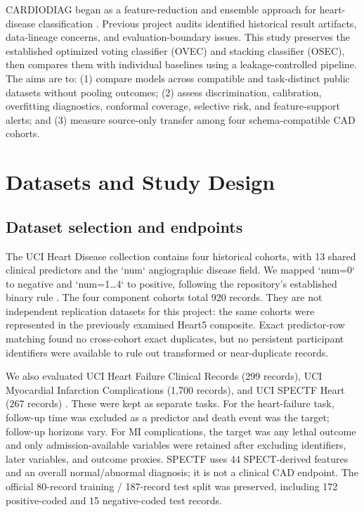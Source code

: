 \documentclass[conference]{IEEEtran}
\begin{document}
CARDIODIAG began as a feature-reduction and ensemble approach for heart-disease classification \cite{khan2026cardiodiag}. Previous project audits identified historical result artifacts, data-lineage concerns, and evaluation-boundary issues. This study preserves the established optimized voting classifier (OVEC) and stacking classifier (OSEC), then compares them with individual baselines using a leakage-controlled pipeline. The aims are to: (1) compare models across compatible and task-distinct public datasets without pooling outcomes; (2) assess discrimination, calibration, overfitting diagnostics, conformal coverage, selective risk, and feature-support alerts; and (3) measure source-only transfer among four schema-compatible CAD cohorts.

\section{Datasets and Study Design}
\subsection{Dataset selection and endpoints}
The UCI Heart Disease collection contains four historical cohorts, with 13 shared clinical predictors and the `num` angiographic disease field. We mapped `num=0` to negative and `num=1\ldots4` to positive, following the repository’s established binary rule \cite{ucihd}. The four component cohorts total 920 records. They are not independent replication datasets for this project: the same cohorts were represented in the previously examined Heart5 composite. Exact predictor-row matching found no cross-cohort exact duplicates, but no persistent participant identifiers were available to rule out transformed or near-duplicate records.

We also evaluated UCI Heart Failure Clinical Records (299 records), UCI Myocardial Infarction Complications (1,700 records), and UCI SPECTF Heart (267 records) \cite{ucihf519,ucimi579,ucispectf}. These were kept as separate tasks. For the heart-failure task, follow-up time was excluded as a predictor and death event was the target; follow-up horizons vary. For MI complications, the target was any lethal outcome and only admission-available variables were retained after excluding identifiers, later variables, and outcome proxies. SPECTF uses 44 SPECT-derived features and an overall normal/abnormal diagnosis; it is not a clinical CAD endpoint. The official 80-record training / 187-record test split was preserved, including 172 positive-coded and 15 negative-coded test records.
\end{document}
